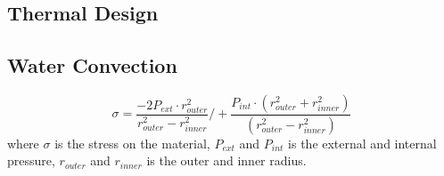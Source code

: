 \subsection{Thermal Design}

\subsection{Water Convection}

\begin{equation}\label{eq:pressure}
\sigma = \frac{-2 P_{ext}\cdot r_{outer}^2}{r_{outer}^2-r_{inner}^2}/ + \frac{P_{int}\cdot (r_{outer}^2+r_{inner}^2)}{(r_{outer}^2-r_{inner}^2)}
\end{equation}
where $\sigma$ is the stress on the material, $P_{ext}$ and $P_{int}$ is the external and internal pressure, $r_{outer}$ and $r_{inner}$ is the outer and inner radius. 


